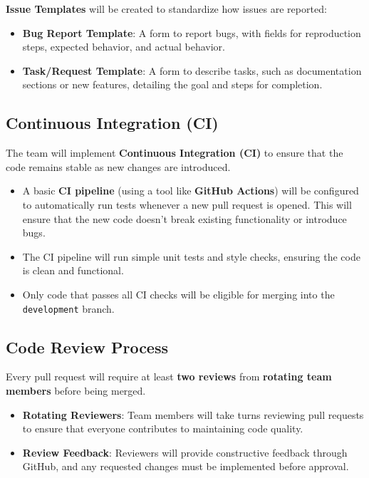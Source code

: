 \documentclass{article}
\begin{document}
\textbf{Issue Templates} will be created to standardize how issues are reported:
\begin{itemize}
    \item \textbf{Bug Report Template}: A form to report bugs, with fields for reproduction steps, expected behavior, and actual behavior.
    \item \textbf{Task/Request Template}: A form to describe tasks, such as documentation sections or new features, detailing the goal and steps for completion.
\end{itemize}

\subsection{Continuous Integration (CI)}
The team will implement \textbf{Continuous Integration (CI)} to ensure that the code remains stable as new changes are introduced.
\begin{itemize}
    \item A basic \textbf{CI pipeline} (using a tool like \textbf{GitHub Actions}) will be configured to automatically run tests whenever a new pull request is opened. This will ensure that the new code doesn’t break existing functionality or introduce bugs.
    \item The CI pipeline will run simple unit tests and style checks, ensuring the code is clean and functional.
    \item Only code that passes all CI checks will be eligible for merging into the \texttt{development} branch.
\end{itemize}

\subsection{Code Review Process}
Every pull request will require at least \textbf{two reviews} from \textbf{rotating team members} before being merged.
\begin{itemize}
    \item \textbf{Rotating Reviewers}: Team members will take turns reviewing pull requests to ensure that everyone contributes to maintaining code quality.
    \item \textbf{Review Feedback}: Reviewers will provide constructive feedback through GitHub, and any requested changes must be implemented before approval.
\end{itemize}
\end{document}
